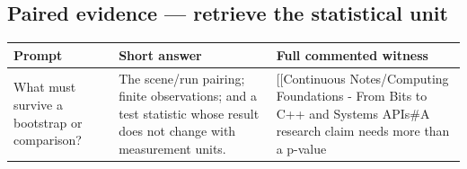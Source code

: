 \subsection{Paired evidence --- retrieve the statistical unit}\label{appendix-cb5af353ef77-paired-evidence-retrieve-the-statistical-unit}

\hypertarget{appendix-cb5af353ef77-paired-evidence-retrieve-the-statistical-unit}{}

{\def\LTcaptype{none} %
\begin{longtable}[]{@{}
  >{\raggedright\arraybackslash}p{}
  >{\raggedright\arraybackslash}p{}
  >{\raggedright\arraybackslash}p{}@{}}
\toprule\noalign{}
\begin{minipage}[b]{\linewidth}\raggedright
Prompt
\end{minipage} & \begin{minipage}[b]{\linewidth}\raggedright
Short answer
\end{minipage} & \begin{minipage}[b]{\linewidth}\raggedright
Full commented witness
\end{minipage} \\
\midrule\noalign{}
\endhead
\bottomrule\noalign{}
\endlastfoot
What must survive a bootstrap or comparison? & The scene/run pairing; finite observations; and a test statistic whose result does not change with measurement units. & {[}{[}Continuous Notes/Computing Foundations - From Bits to C++ and Systems APIs\#A research claim needs more than a p-value \\
\end{longtable}
}

